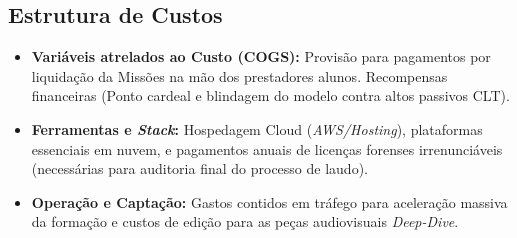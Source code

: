 \documentclass[../main.tex]{subfiles}
\begin{document}
\subsection*{Estrutura de Custos}
\begin{itemize}
  \item \textbf{Variáveis atrelados ao Custo (COGS):} Provisão para pagamentos por liquidação da Missões na mão dos prestadores alunos. Recompensas financeiras (Ponto cardeal e blindagem do modelo contra altos passivos CLT).
  \item \textbf{Ferramentas e \textit{Stack}:} Hospedagem Cloud (\textit{AWS/Hosting}), plataformas essenciais em nuvem, e pagamentos anuais de licenças forenses irrenunciáveis (necessárias para auditoria final do processo de laudo).
  \item \textbf{Operação e Captação:} Gastos contidos em tráfego para aceleração massiva da formação e custos de edição para as peças audiovisuais \textit{Deep-Dive}.
\end{itemize}
\end{document}
